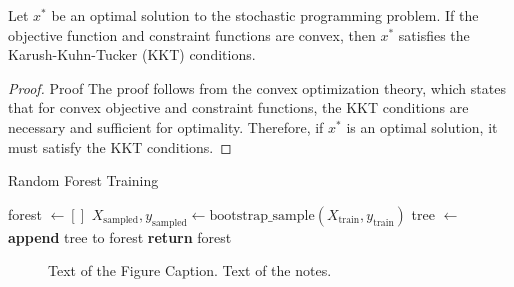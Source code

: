 \documentclass[opre,sglanonrev]{informs4}
\begin{document}
\begin{theorem}\label{thm:Opt}
Let $x^*$ be an optimal solution to the stochastic programming problem. If the objective function and constraint functions are convex, then $x^*$ satisfies the Karush-Kuhn-Tucker (KKT) conditions.
\end{theorem}

\begin{proof}{Proof}
The proof follows from the convex optimization theory, which states that for convex objective and constraint functions, the KKT conditions are necessary and sufficient for optimality. Therefore, if $x^*$ is an optimal solution, it must satisfy the KKT conditions.\Halmos
\end{proof}

\begin{algorithm}
\caption{Random Forest Training}
\vskip6pt
\begin{algorithmic}
    \State forest $\gets []$
        \State $X_{\text{sampled}}, y_{\text{sampled}} \gets \text{bootstrap\_sample}(X_{\text{train}}, y_{\text{train}})$
        \State tree $\gets$ 
        \State \textbf{append} tree to forest
    \EndFor
    \State \textbf{return} forest
\EndProcedure
\Statex
\end{algorithmic}
\end{algorithm}

 \begin{figure}
     \FIGURE
 {}
{Text of the Figure Caption. \label{fig1}}
{Text of the notes.}
\end{figure}
\end{document}
